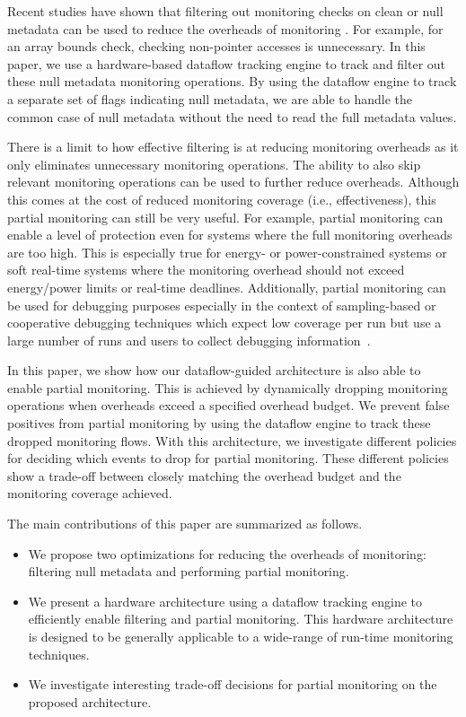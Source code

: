 Recent studies have shown that filtering out monitoring checks on clean or null
metadata can be used to reduce the overheads of monitoring \cite{fade-hpca14}.
For example, for
an array bounds check, checking non-pointer accesses is unnecessary. 
In this paper, we use a hardware-based dataflow tracking engine to track and
filter out these null metadata monitoring operations.
By using the dataflow engine to track a separate set of flags
indicating null metadata, we are able to handle the common case of null
metadata without the need to read the full metadata values.

There is a limit to how effective filtering is at reducing monitoring overheads
as it only eliminates unnecessary monitoring operations. The ability
to also skip relevant monitoring operations can be used to further reduce overheads.
Although this comes at the cost of reduced monitoring coverage (i.e.,
effectiveness), this partial monitoring can still be very useful.
For example, partial
monitoring can enable a level of protection even for systems where the full
monitoring overheads are too high. This is especially true for energy- or
power-constrained systems or soft real-time systems where the monitoring
overhead should not exceed energy/power limits or real-time deadlines.
Additionally, partial monitoring can be used for debugging purposes
especially in the context of sampling-based or cooperative debugging techniques
which expect low coverage per run but use a large number of runs and users to
collect debugging information~\cite{liblit-pldi05, chilimbi-asplos04,
greathouse-cgo11}. 

In this paper, we show how our dataflow-guided architecture is also able to
enable partial monitoring. This is achieved by dynamically dropping monitoring
operations when overheads exceed a specified overhead budget. We prevent false
positives from partial monitoring by using the dataflow engine to track these
dropped monitoring flows. With this architecture, we investigate different
policies for deciding which events to drop for partial monitoring. These
different policies show a trade-off between closely matching the overhead
budget and the monitoring coverage achieved.

The main contributions of this paper are summarized as follows.
\begin{itemize}
  \item We propose two optimizations for reducing the overheads of monitoring: filtering null metadata and performing partial monitoring.
  \item We present a hardware architecture using a dataflow tracking engine to
  efficiently enable filtering and partial monitoring. This hardware
  architecture is designed to be generally applicable to a wide-range of run-time monitoring
  techniques.
  \item We investigate interesting trade-off decisions for partial monitoring on the proposed architecture.
\end{itemize}

